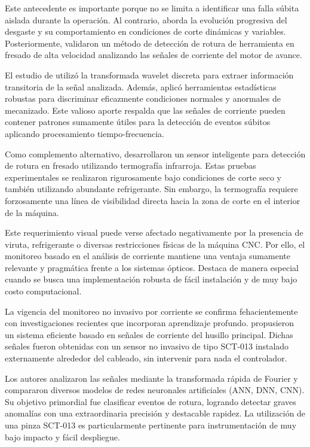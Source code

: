 Este antecedente es importante porque no se limita a identificar una falla súbita aislada durante la operación. Al contrario, aborda la evolución progresiva del desgaste y su comportamiento en condiciones de corte dinámicas y variables. Posteriormente, \cite{sevilla2011} validaron un método de detección de rotura de herramienta en fresado de alta velocidad analizando las señales de corriente del motor de avance.

El estudio de \cite{sevilla2011} utilizó la transformada wavelet discreta para extraer información transitoria de la señal analizada. Además, aplicó herramientas estadísticas robustas para discriminar eficazmente condiciones normales y anormales de mecanizado. Este valioso aporte respalda que las señales de corriente pueden contener patrones sumamente útiles para la detección de eventos súbitos aplicando procesamiento tiempo-frecuencia.

Como complemento alternativo, \cite{ramirez2018} desarrollaron un sensor inteligente para detección de rotura en fresado utilizando termografía infrarroja. Estas pruebas experimentales se realizaron rigurosamente bajo condiciones de corte seco y también utilizando abundante refrigerante. Sin embargo, la termografía requiere forzosamente una línea de visibilidad directa hacia la zona de corte en el interior de la máquina.

Este requerimiento visual puede verse afectado negativamente por la presencia de viruta, refrigerante o diversas restricciones físicas de la máquina CNC. Por ello, el monitoreo basado en el análisis de corriente mantiene una ventaja sumamente relevante y pragmática frente a los sistemas ópticos. Destaca de manera especial cuando se busca una implementación robusta de fácil instalación y de muy bajo costo computacional.

La vigencia del monitoreo no invasivo por corriente se confirma fehacientemente con investigaciones recientes que incorporan aprendizaje profundo. \cite{lai2025} propusieron un sistema eficiente basado en señales de corriente del husillo principal. Dichas señales fueron obtenidas con un sensor no invasivo de tipo SCT-013 instalado externamente alrededor del cableado, sin intervenir para nada el controlador.

Los autores analizaron las señales mediante la transformada rápida de Fourier y compararon diversos modelos de redes neuronales artificiales (ANN, DNN, CNN). Su objetivo primordial fue clasificar eventos de rotura, logrando detectar graves anomalías con una extraordinaria precisión y destacable rapidez. La utilización de una pinza SCT-013 es particularmente pertinente para instrumentación de muy bajo impacto y fácil despliegue.


